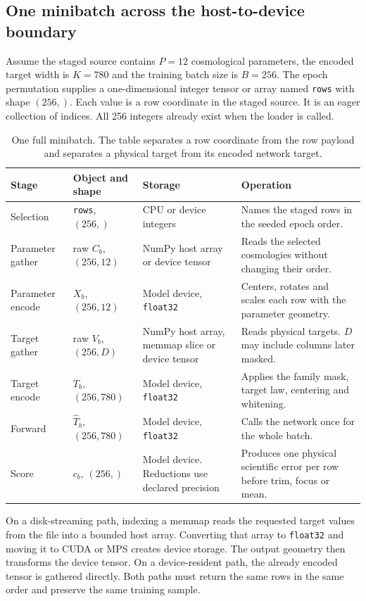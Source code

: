 \documentclass[10pt,aps,prd,twocolumn,nofootinbib]{revtex4-2}
\newcommand{\code}[1]{\texttt{#1}}
\begin{document}
\subsection{One minibatch across the host-to-device boundary}

Assume the staged source contains $P=12$ cosmological parameters, the encoded
target width is $K=780$ and the training batch size is $B=256$.  The epoch
permutation supplies a one-dimensional integer tensor or array named
\code{rows} with shape $(256,)$.  Each value is a row coordinate in the
staged source.  It is an eager collection of indices.  All 256 integers
already exist when the loader is called.

\begin{table}[t]
\centering
\begin{tabular}{p{}p{}p{}p{}}
\toprule
Stage & Object and shape & Storage & Operation \\
\midrule
Selection & \code{rows}, $(256,)$ & CPU or device integers & Names the staged
rows in the seeded epoch order.  \\
Parameter gather & raw $C_b$, $(256,12)$ & NumPy host array or device tensor &
Reads the selected cosmologies without changing their order.  \\
Parameter encode & $X_b$, $(256,12)$ & Model device, \code{float32} & Centers,
rotates and scales each row with the parameter geometry.  \\
Target gather & raw $V_b$, $(256,D)$ & NumPy host array, memmap slice or device
tensor & Reads physical targets. $D$ may include columns later masked.  \\
Target encode & $T_b$, $(256,780)$ & Model device, \code{float32} & Applies the
family mask, target law, centering and whitening.  \\
Forward & $\widehat T_b$, $(256,780)$ & Model device, \code{float32} & Calls the
network once for the whole batch.  \\
Score & $c_b$, $(256,)$ & Model device.  Reductions use declared precision &
Produces one physical scientific error per row before trim, focus or mean.  \\
\bottomrule
\end{tabular}
\caption{One full minibatch.  The table separates a row coordinate from the
row payload and separates a physical target from its encoded network target.}
\end{table}

On a disk-streaming path, indexing a memmap reads the requested target values
from the file into a bounded host array.  Converting that array to
\code{float32} and moving it to CUDA or MPS creates device storage.  The
output geometry then transforms the device tensor.  On a device-resident path,
the already encoded tensor is gathered directly.  Both paths must return the
same rows in the same order and preserve the same training sample.
\end{document}
